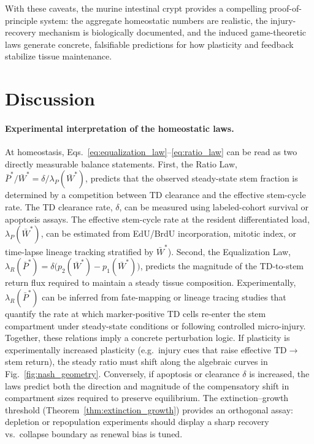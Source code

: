 \documentclass[pdflatex,sn-mathphys-ay]{sn-jnl}
\theoremstyle{thmstyleone}
\theoremstyle{definition}
\theoremstyle{remark}
\begin{document}
With these caveats, the murine intestinal crypt provides a compelling proof-of-principle
system: the aggregate homeostatic numbers are realistic, the injury-recovery mechanism is
biologically documented, and the induced game-theoretic laws generate concrete,
falsifiable predictions for how plasticity and feedback stabilize tissue maintenance.

\section{Discussion}
\label{sec:discussion}
\paragraph{Experimental interpretation of the homeostatic laws.}
At homeostasis, Eqs.~\eqref{eq:equalization_law}--\eqref{eq:ratio_law} can be read as two directly measurable balance statements. 
First, the Ratio Law, $\bar P^*/\bar W^*=\delta/\lambda_P(\bar W^*)$, predicts that the observed steady-state stem fraction is determined by a competition between TD clearance and the effective stem-cycle rate.
The TD clearance rate, $\delta$, can be measured using labeled-cohort survival or apoptosis assays.
The effective stem-cycle rate at the resident differentiated load, $\lambda_P(\bar W^*)$, can be estimated from EdU/BrdU incorporation, mitotic index, or time-lapse lineage tracking stratified by $\bar W^*$). 
Second, the Equalization Law, $\lambda_R(\bar P^*)=\delta\big(p_2(\bar W^*)-p_1(\bar W^*)\big)$, predicts the magnitude of the TD-to-stem return flux required to maintain a steady tissue composition. Experimentally, $\lambda_R(\bar P^*)$ can be inferred from fate-mapping or lineage tracing studies that quantify the rate at which marker-positive TD cells re-enter the stem compartment under steady-state conditions or following controlled micro-injury.
Together, these relations imply a concrete perturbation logic.
If plasticity is experimentally increased plasticity (e.g.\ injury cues that raise effective TD$\to$stem return), the steady ratio must shift along the algebraic curves in Fig.~\ref{fig:nash_geometry}. 
Conversely, if apoptosis or clearance $\delta$ is increased, the laws predict both the direction and magnitude of the compensatory shift in compartment sizes required to preserve equilibrium. 
The extinction--growth threshold (Theorem~\ref{thm:extinction_growth}) provides an orthogonal assay: depletion or repopulation experiments should display a sharp recovery vs.\ collapse boundary as renewal bias is tuned.
\end{document}
